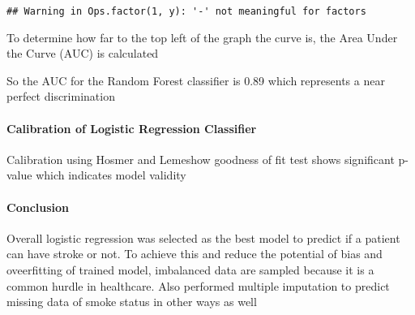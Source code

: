 \documentclass[]{article}
\newenvironment{Shaded}{\begin{snugshade}}{\end{snugshade}}
\newcommand{\DataTypeTok}[1]{\textcolor[rgb]{0.13,0.29,0.53}{#1}}
\newcommand{\DecValTok}[1]{\textcolor[rgb]{0.00,0.00,0.81}{#1}}
\newcommand{\KeywordTok}[1]{\textcolor[rgb]{0.13,0.29,0.53}{\textbf{#1}}}
\newcommand{\NormalTok}[1]{#1}
\newcommand{\OperatorTok}[1]{\textcolor[rgb]{0.81,0.36,0.00}{\textbf{#1}}}
\let\oldparagraph\paragraph
\renewcommand{\paragraph}[1]{\oldparagraph{#1}\mbox{}}
\begin{document}
\begin{Shaded}
\end{Shaded}

\begin{verbatim}
## Warning in Ops.factor(1, y): '-' not meaningful for factors
\end{verbatim}

To determine how far to the top left of the graph the curve is, the Area
Under the Curve (AUC) is calculated

So the AUC for the Random Forest classifier is 0.89 which represents a
near perfect discrimination

\hypertarget{calibration-of-logistic-regression-classifier-1}{%
\paragraph{Calibration of Logistic Regression
Classifier}\label{calibration-of-logistic-regression-classifier-1}}

Calibration using Hosmer and Lemeshow goodness of fit test shows
significant p-value which indicates model validity

\hypertarget{conclusion}{%
\paragraph{Conclusion}\label{conclusion}}

Overall logistic regression was selected as the best model to predict if
a patient can have stroke or not. To achieve this and reduce the
potential of bias and oveerfitting of trained model, imbalanced data are
sampled because it is a common hurdle in healthcare. Also performed
multiple imputation to predict missing data of smoke status in other
ways as well
\end{document}
